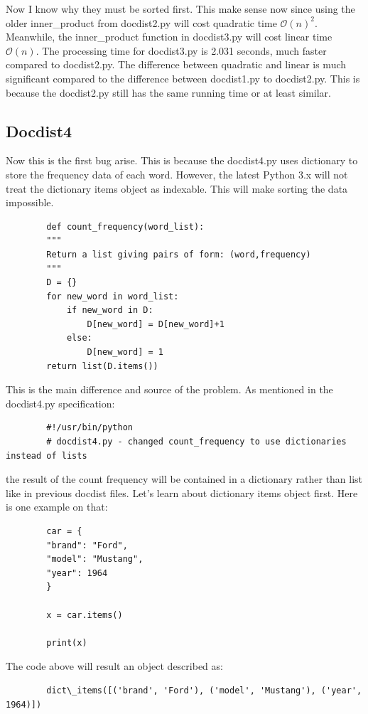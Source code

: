 \documentclass{article}
\begin{document}
    Now I know why they must be sorted first. 
    This make sense now since using the older inner\_product from docdist2.py will cost quadratic time $\mathcal{O}(n)^2$.
    Meanwhile, the inner\_product function in docdist3.py will cost linear time $\mathcal{O}(n)$.
    The processing time for docdist3.py is 2.031 seconds, much faster compared to docdist2.py.
    The difference between quadratic and linear is much significant compared to the difference between docdist1.py to docdist2.py.
    This is because the docdist2.py still has the same running time or at least similar.

    \subsection{Docdist4}
    Now this is the first bug arise. 
    This is because the docdist4.py uses dictionary to store the frequency data of each word.
    However, the latest Python 3.x will not treat the dictionary items object as indexable.
    This will make sorting the data impossible.
    \begin{lstlisting}
        def count_frequency(word_list):
        """
        Return a list giving pairs of form: (word,frequency)
        """
        D = {}
        for new_word in word_list:
            if new_word in D:
                D[new_word] = D[new_word]+1
            else:
                D[new_word] = 1
        return list(D.items())
    \end{lstlisting}
    This is the main difference and source of the problem. 
    As mentioned in the docdist4.py specification:
    \begin{lstlisting}
        #!/usr/bin/python
        # docdist4.py - changed count_frequency to use dictionaries instead of lists
    \end{lstlisting}
    the result of the count frequency will be contained in a dictionary rather than list like in previous docdist files.
    Let's learn about dictionary items object first.
    Here is one example on that:
    \begin{lstlisting}
        car = {
        "brand": "Ford",
        "model": "Mustang",
        "year": 1964
        }

        x = car.items()

        print(x)
    \end{lstlisting}
    The code above will result an object described as:
    \begin{lstlisting}
        dict\_items([('brand', 'Ford'), ('model', 'Mustang'), ('year', 1964)])
    \end{lstlisting}
\end{document}
